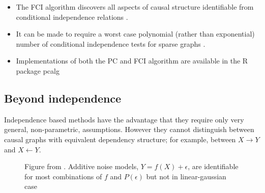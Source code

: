 \documentclass[20pt]{extreport}
\begin{document}
\begin{itemize}
\item The FCI algorithm discovers all aspects of causal structure identifiable from conditional independence relations \cite{Zhang2008}.
\item It can be made to require a worst case polynomial (rather than exponential) number of conditional independence tests for sparse graphs \cite{Claassen2013}. 
\item Implementations of both the PC and FCI algorithm are available in the R package pcalg \cite{Kalisch2012}
\end{itemize}


\subsection*{Beyond independence}
Independence based methods have the advantage that they require only very general, non-parametric, assumptions. However they cannot distinguish between causal graphs with equivalent dependency structure; for example, between $X \rightarrow Y$ and $X \leftarrow Y$.


\begin{figure}
\centering
\caption{Figure from {\cite{Hoyer2009}}. Additive noise models, $Y = f(X)+\epsilon$, are identifiable for most combinations of $f$ and $P(\epsilon)$ but not in linear-gaussian case}
{}
\end{figure}
\end{document}
